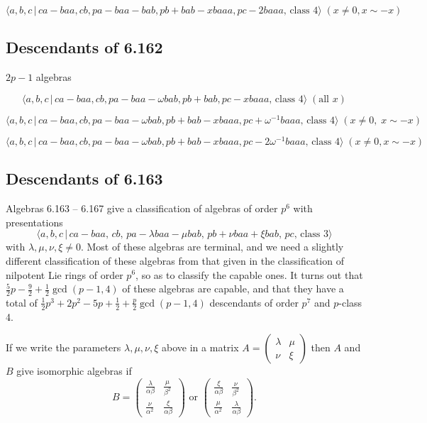 \documentclass[10pt]{article}
\begin{document}
\begin{equation}
\langle a,b,c\,|\,ca-baa,cb,pa-baa-bab,pb+bab-xbaaa,pc-2baaa,\,\text{class }%
4\rangle \;(x \neq 0, x \sim -x)  \tag{7.1759}
\end{equation}

\subsection{Descendants of 6.162}

$2p-1$ algebras

\begin{equation}
\langle a,b,c\,|\,ca-baa,cb,pa-baa-\omega bab,pb+bab,pc-xbaaa,\,\text{class }%
4\rangle \;(\text{all }x)  \tag{7.1760}
\end{equation}

\begin{equation}
\langle a,b,c\,|\,ca-baa,cb,pa-baa-\omega bab,pb+bab-xbaaa,pc+\omega
^{-1}baaa,\,\text{class }4\rangle \;(x\neq 0,\;x\sim -x)  \tag{7.1761}
\end{equation}

\begin{equation}
\langle a,b,c\,|\,ca-baa,cb,pa-baa-\omega bab,pb+bab-xbaaa,pc-2\omega
^{-1}baaa,\,\text{class }4\rangle \;(x\neq 0,x\sim -x)  \tag{7.1762}
\end{equation}

\subsection{Descendants of 6.163}

Algebras 6.163 -- 6.167 give a classification of algebras of order $p^{6}$
with presentations 
\[
\langle a,b,c\,|\,ca-baa,\,cb,\,pa-\lambda baa-\mu bab,\,pb+\nu baa+\xi
bab,\,pc,\,\text{class }3\rangle 
\]%
with $\lambda ,\mu ,\nu ,\xi \neq 0$. Most of these algebras are terminal,
and we need a slightly different classification of these algebras from that
given in the classification of nilpotent Lie rings of order $p^{6}$, so as
to classify the capable ones. It turns out that $\frac{5}{2}p-\frac{9}{2}+%
\frac{1}{2}\gcd (p-1,4)$ of these algebras are capable, and that they have a
total of $\frac{1}{2}p^{3}+2p^{2}-5p+\frac{1}{2}+\frac{p}{2}\gcd (p-1,4)$
descendants of order $p^{7}$ and $p$-class 4.

If we write the parameters $\lambda ,\mu ,\nu ,\xi $ above in a matrix $%
A=\left( 
\begin{array}{cc}
\lambda & \mu \\ 
\nu & \xi%
\end{array}%
\right) $ then $A$ and $B$ give isomorphic algebras if%
\[
B=\left( 
\begin{array}{cc}
\frac{\lambda }{\alpha \beta } & \frac{\mu }{\beta ^{2}} \\ 
\frac{\nu }{\alpha ^{2}} & \frac{\xi }{\alpha \beta }%
\end{array}%
\right) \text{ or }\left( 
\begin{array}{cc}
\frac{\xi }{\alpha \beta } & \frac{\nu }{\beta ^{2}} \\ 
\frac{\mu }{\alpha ^{2}} & \frac{\lambda }{\alpha \beta }%
\end{array}%
\right) . 
\]
\end{document}
